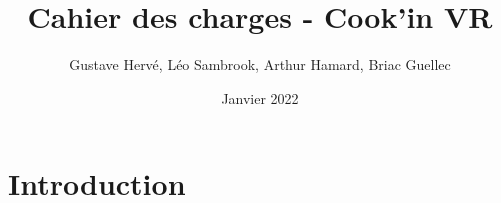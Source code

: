 \documentclass{article}
\title{Cahier des charges - Cook'in VR}
\author{Gustave Hervé, Léo Sambrook, Arthur Hamard, Briac Guellec}
\date{Janvier 2022}
\begin{document}
\maketitle

\section{Introduction}

\lipsum[1]
\lipsum[2]
\lipsum[3]
\lipsum[4]
\lipsum[5]
\lipsum[6]
\end{document}
